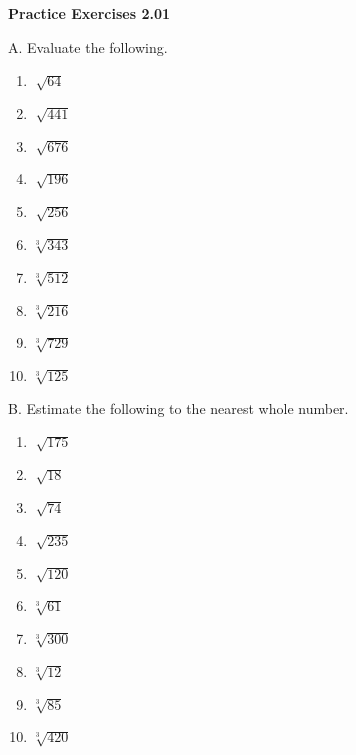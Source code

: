\vspace{0.3ex}
\noindent\textbf{Practice Exercises 2.01}

\vspace{0.2ex}

A. Evaluate the following.
\begin{multicols}{4}
\begin{enumerate}[noitemsep, label = \color{blue}\arabic*. ]
\item \(\sqrt[]{64}\)
\item \(\sqrt[]{441}\)
\item \(\sqrt[]{676}\)
\item \(\sqrt[]{196}\)
\item \(\sqrt[]{256}\)
\item \(\sqrt[{\scriptstyle 3}]{343}\)
\item \(\sqrt[{\scriptstyle 3}]{512}\)
\item \(\sqrt[{\scriptstyle 3}]{216}\)
\item \(\sqrt[{\scriptstyle 3}]{729}\)
\item \(\sqrt[{\scriptstyle 3}]{125}\)
\end{enumerate}
\end{multicols}


B. Estimate the following to the nearest whole number.
\begin{multicols}{4}
\begin{enumerate}[noitemsep, label = \color{blue}\arabic*. ]
\item \(\sqrt[]{175}\)
\item \(\sqrt[]{18}\)
\item \(\sqrt[]{74}\)
\item \(\sqrt[]{235}\)
\item \(\sqrt[]{120}\)
\item \(\sqrt[{\scriptstyle 3}]{61}\)
\item \(\sqrt[{\scriptstyle 3}]{300}\)
\item \(\sqrt[{\scriptstyle 3}]{12}\)
\item \(\sqrt[{\scriptstyle 3}]{85}\)
\item \(\sqrt[{\scriptstyle 3}]{420}\)
\end{enumerate}
\end{multicols}
